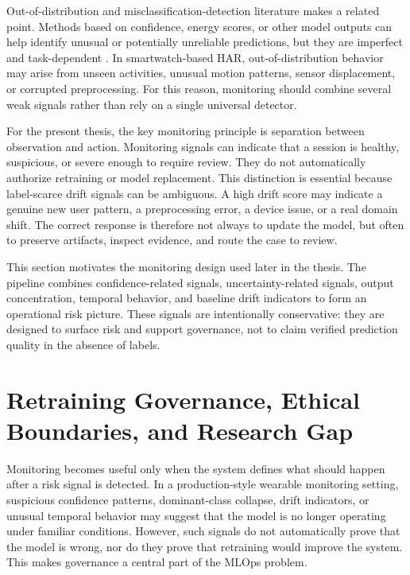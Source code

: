 Out-of-distribution and misclassification-detection literature makes a related point. Methods based on confidence, energy scores, or other model outputs can help identify unusual or potentially unreliable predictions, but they are imperfect and task-dependent \cite{hendrycks2017baseline,liu2020energy}. In smartwatch-based HAR, out-of-distribution behavior may arise from unseen activities, unusual motion patterns, sensor displacement, or corrupted preprocessing. For this reason, monitoring should combine several weak signals rather than rely on a single universal detector.

For the present thesis, the key monitoring principle is separation between observation and action. Monitoring signals can indicate that a session is healthy, suspicious, or severe enough to require review. They do not automatically authorize retraining or model replacement. This distinction is essential because label-scarce drift signals can be ambiguous. A high drift score may indicate a genuine new user pattern, a preprocessing error, a device issue, or a real domain shift. The correct response is therefore not always to update the model, but often to preserve artifacts, inspect evidence, and route the case to review.

This section motivates the monitoring design used later in the thesis. The pipeline combines confidence-related signals, uncertainty-related signals, output concentration, temporal behavior, and baseline drift indicators to form an operational risk picture. These signals are intentionally conservative: they are designed to surface risk and support governance, not to claim verified prediction quality in the absence of labels.

\section{Retraining Governance, Ethical Boundaries, and Research Gap}

Monitoring becomes useful only when the system defines what should happen after a risk signal is detected. In a production-style wearable monitoring setting, suspicious confidence patterns, dominant-class collapse, drift indicators, or unusual temporal behavior may suggest that the model is no longer operating under familiar conditions. However, such signals do not automatically prove that the model is wrong, nor do they prove that retraining would improve the system. This makes governance a central part of the MLOps problem.

